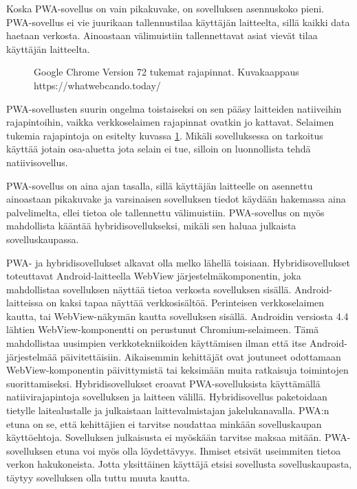 \documentclass{tktltiki}
\begin{document}
Koska PWA-sovellus on vain pikakuvake, on sovelluksen asennuskoko pieni. PWA-sovellus ei vie juurikaan tallennustilaa käyttäjän laitteelta, sillä kaikki data haetaan verkosta. Ainoastaan välimuistiin tallennettavat asiat vievät tilaa käyttäjän laitteelta.

\begin{figure}[h]
\begin{center}
\caption{Google Chrome Version 72 tukemat rajapinnat. Kuvakaappaus https://whatwebcando.today/ }
\label{Selaimen rajapinnat}
\end{center}
\end{figure}
\clearpage

PWA-sovellusten suurin ongelma toistaiseksi on sen pääsy laitteiden natiiveihin rajapintoihin, vaikka verkkoselaimen rajapinnat ovatkin jo kattavat. Selaimen tukemia rajapintoja on esitelty kuvassa \ref{Selaimen rajapinnat}. Mikäli sovelluksessa on tarkoitus käyttää jotain osa-aluetta jota selain ei tue, silloin on luonnollista tehdä natiivisovellus.

PWA-sovellus on aina ajan tasalla, sillä käyttäjän laitteelle on asennettu ainoastaan pikakuvake ja varsinaisen sovelluksen tiedot käydään hakemassa aina palvelimelta, ellei tietoa ole tallennettu välimuistiin. PWA-sovellus on myös mahdollista kääntää hybridisovellukseksi, mikäli sen haluaa julkaista sovelluskaupassa. 

PWA- ja hybridisovellukset alkavat olla melko lähellä toisiaan. Hybridisovellukset toteuttavat Android-laitteella WebView järjestelmäkomponentin, joka mahdollistaa sovelluksen näyttää tietoa verkosta sovelluksen sisällä. Android-laitteissa on kaksi tapaa näyttää verkkosisältöä. Perinteisen verkkoselaimen kautta, tai WebView-näkymän kautta sovelluksen sisällä. Androidin versiosta 4.4 \cite{chromedeveloper} lähtien WebView-komponentti on perustunut Chromium-selaimeen. Tämä mahdollistaa uusimpien verkkotekniikoiden käyttämisen ilman että itse Android-järjestelmää päivitettäisiin. Aikaisemmin kehittäjät ovat joutuneet odottamaan WebView-komponentin päivittymistä tai keksimään muita ratkaisuja toimintojen suorittamiseksi. Hybridisovellukset eroavat PWA-sovelluksista käyttämällä natiivirajapintoja sovelluksen ja laitteen välillä. Hybridisovellus paketoidaan tietylle laitealustalle ja julkaistaan laittevalmistajan jakelukanavalla. PWA:n etuna on se, että kehittäjien ei tarvitse noudattaa minkään sovelluskaupan käyttöehtoja. Sovelluksen julkaisusta ei myöskään tarvitse maksaa mitään. PWA-sovelluksen etuna voi myös olla löydettävyys. Ihmiset etsivät useimmiten tietoa verkon hakukoneista. Jotta yksittäinen käyttäjä etsisi sovellusta sovelluskaupasta, täytyy sovelluksen olla tuttu muuta kautta. 
\end{document}
